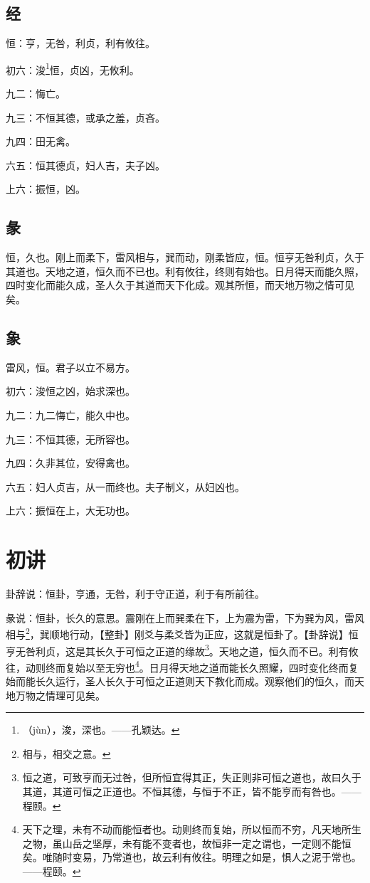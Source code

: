 \documentclass[12pt,oneside]{book}
\begin{document}
\subsection{经}
恒：亨，无咎，利贞，利有攸往。

初六：浚\footnote{（jùn），浚，深也。——孔颖达。}恒，贞凶，无攸利。

九二：悔亡。

九三：不恒其德，或承之羞，贞吝。

九四：田无禽。

六五：恒其德贞，妇人吉，夫子凶。

上六：振恒，凶。

\subsection{彖}
恒，久也。刚上而柔下，雷风相与，巽而动，刚柔皆应，恒。恒亨无咎利贞，久于其道也。天地之道，恒久而不已也。利有攸往，终则有始也。日月得天而能久照，四时变化而能久成，圣人久于其道而天下化成。观其所恒，而天地万物之情可见矣。

\subsection{象}
雷风，恒。君子以立不易方。

初六：浚恒之凶，始求深也。

九二：九二悔亡，能久中也。

九三：不恒其德，无所容也。

九四：久非其位，安得禽也。

六五：妇人贞吉，从一而终也。夫子制义，从妇凶也。

上六：振恒在上，大无功也。

\section{初讲}
卦辞说：恒卦，亨通，无咎，利于守正道，利于有所前往。

彖说：恒卦，长久的意思。震刚在上而巽柔在下，上为震为雷，下为巽为风，雷风相与\footnote{相与，相交之意。}，巽顺地行动，【整卦】刚爻与柔爻皆为正应，这就是恒卦了。【卦辞说】恒亨无咎利贞，这是其长久于可恒之正道的缘故\footnote{恒之道，可致亨而无过咎，但所恒宜得其正，失正则非可恒之道也，故曰久于其道，其道可恒之正道也。不恒其德，与恒于不正，皆不能亨而有咎也。——程颐。}。天地之道，恒久而不已。利有攸往，动则终而复始以至无穷也\footnote{天下之理，未有不动而能恒者也。动则终而复始，所以恒而不穷，凡天地所生之物，虽山岳之坚厚，未有能不变者也，故恒非一定之谓也，一定则不能恒矣。唯随时变易，乃常道也，故云利有攸往。明理之如是，惧人之泥于常也。——程颐。}。日月得天地之道而能长久照耀，四时变化终而复始而能长久运行，圣人长久于可恒之正道则天下教化而成。观察他们的恒久，而天地万物之情理可见矣。
\end{document}
